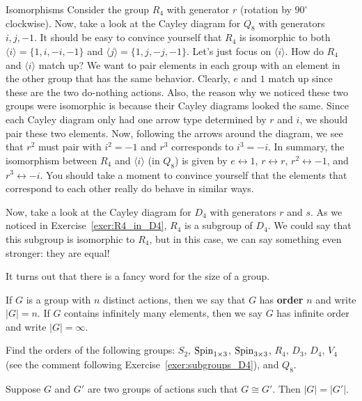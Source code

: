 \begin{section}{Isomorphisms}
Consider the group $R_4$ with generator $r$ (rotation by $90^\circ$ clockwise).  Now, take a look at the Cayley diagram for $Q_8$ with generators $i, j, -1$.  It should be easy to convince yourself that $R_4$ is isomorphic to both $\langle i\rangle=\{1,i,-i,-1\}$ and $\langle j\rangle=\{1,j,-j,-1\}$.  Let's just focus on $\langle i\rangle$.  How do $R_4$ and $\langle i\rangle$ match up?  We want to pair elements in each group with an element in the other group that has the same behavior.  Clearly, $e$ and $1$ match up since these are the two do-nothing actions.  Also, the reason why we noticed these two groups were isomorphic is because their Cayley diagrams looked the same.  Since each Cayley diagram only had one arrow type determined by $r$ and $i$, we should pair these two elements.  Now, following the arrows around the diagram, we see that $r^2$ must pair with $i^2=-1$ and $r^3$ corresponds to $i^3=-i$.  In summary, the isomorphism between $R_4$ and $\langle i\rangle$ (in $Q_8$) is given by $e\leftrightarrow 1$, $r\leftrightarrow r$, $r^2\leftrightarrow -1$, and $r^3\leftrightarrow -i$.  You should take a moment to convince yourself that the elements that correspond to each other really do behave in similar ways.

Now, take a look at the Cayley diagram for $D_4$ with generators $r$ and $s$.  As we noticed in Exercise~\ref{exer:R4_in_D4}, $R_4$ is a subgroup of $D_4$.  We could say that this subgroup is isomorphic to $R_4$, but in this case, we can say something even stronger: they are equal!

It turns out that there is a fancy word for the size of a group.

\begin{definition}
If $G$ is a group with $n$ distinct actions, then we say that $G$ has \textbf{order} $n$ and write $|G|=n$.  If $G$ contains infinitely many elements, then we say $G$ has infinite order and write $|G|=\infty$.
\end{definition}

\begin{exercise}
Find the orders of the following groups: $S_2$, $\operatorname{Spin}_{1\times 3}$, $\operatorname{Spin}_{3\times 3}$, $R_4$, $D_3$, $D_4$, $V_4$ (see the comment following Exercise~\ref{exer:subgroups_D4}), and $Q_8$.
\end{exercise}

\begin{theorem}
Suppose $G$ and $G'$ are two groups of actions such that $G\cong G'$.  Then $|G|=|G'|$.
\end{theorem}


\end{section}
